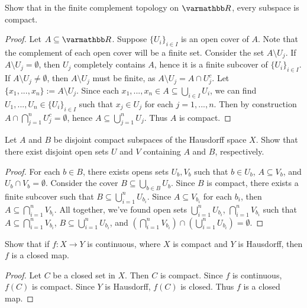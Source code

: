 \documentclass[10pt,oneside,openany]{memoir}
\begin{document}
\begin{exercise}[manual-num={2(a)}]
Show that in the finite complement topology on $\bfR$, every subspace is compact.
\end{exercise}
    \begin{proof}
        Let $A \subseteq \bfR$. Suppose $\{U_i\}_{i \in I}$ is an open cover of $A$. Note that the complement of each open cover will be a finite set. Consider the set $A \setminus U_j$. If $A \setminus U_j = \emptyset$, then $U_j$ completely contains $A$, hence it is a finite subcover of $\{U_i\}_{i \in I}$. If $A \setminus U_j \neq \emptyset$, then $A \setminus U_j$ must be finite, as $A \setminus U_j = A \cap U_j^c$. Let $\{x_1,...,x_n\} := A \setminus U_j$. Since each $x_1,...,x_n \in A \subseteq \bigcup_{i \in I}U_i$, we can find $U_1,...,U_n \in \{U_i\}_{i \in I}$ such that $x_j \in U_j$ for each $j=1,...,n$. Then by construction $A \cap \bigcap_{j = 1}^n U_j^c = \emptyset$, hence $A \subseteq \bigcup_{j = 1}^n U_j$. Thus $A$ is compact.
    \end{proof}

\begin{exercise}[manual-num={5}]
Let $A$ and $B$ be disjoint compact subspaces of the Hausdorff space $X$. Show that there exist disjoint open sets $U$ and $V$ containing $A$ and $B$, respectively.
\end{exercise}
    \begin{proof}
        For each $b \in B$, there exists opens sets $U_b, V_b$ such that $b \in U_b$, $A \subseteq V_b$, and $U_b \cap V_b = \emptyset$. Consider the cover $B \subseteq \bigcup_{b \in B}U_b$. Since $B$ is compact, there exists a finite subcover such that $B \subseteq \bigcup_{i = 1}^n U_{b_i}$. Since $A \subseteq V_{b_i}$ for each $b_i$, then $A \subseteq \bigcap_{i = 1}^n V_{b_i}$. All together, we've found open sets $\bigcup_{i = 1}^n U_{b_i}$, $\bigcap_{i = 1}^n V_{b_i}$ such that $A \subseteq \bigcap_{i = 1}^n V_{b_i}$, $B \subseteq \bigcup_{i = 1}^n U_{b_i}$, and $\left(\bigcap_{i = 1}^n V_{b_i}\right) \cap \left(\bigcup_{i = 1}^n U_{b_i}\right) = \emptyset$.
    \end{proof}

\begin{exercise}[manual-num={6}]
Show that if $f:X \rightarrow Y$ is continuous, where $X$ is compact and $Y$ is Hausdorff, then $f$ is a closed map.
\end{exercise}
    \begin{proof}
        Let $C$ be a closed set in $X$. Then $C$ is compact. Since $f$ is continuous, $f(C)$ is compact. Since $Y$ is Hausdorff, $f(C)$ is closed. Thus $f$ is a closed map.
    \end{proof}
\end{document}
